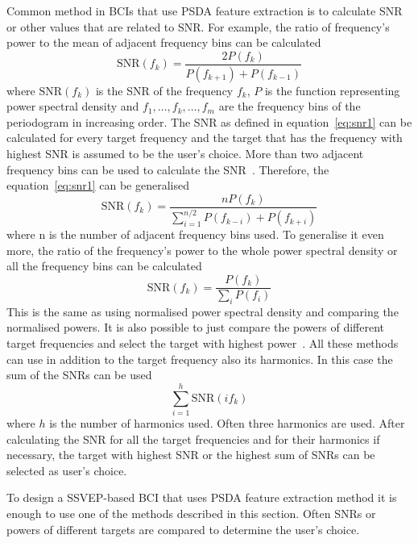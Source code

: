 Common method in \glspl{BCI} that use \gls{PSDA} \gls{feature extraction} is to calculate \gls{SNR} or other values that are related to \gls{SNR}. For example, the ratio of frequency's power to the mean of adjacent frequency bins can be calculated~\cite{psda_snr1}
\begin{equation}
	\label{eq:snr1}
	\mbox{SNR}(f_k) = \frac{2P(f_k)}{P(f_{k+1})+P(f_{k-1})}
\end{equation}
where $\mbox{SNR}(f_k)$ is the \gls{SNR} of the frequency $f_k$, $P$ is the function representing \gls{power spectral density} and $f_1,\dots, f_k,\dots,f_m$ are the \glspl{frequency bin} of the \gls{periodogram} in increasing order. The \gls{SNR} as defined in equation~\ref{eq:snr1} can be calculated for every \gls{target} frequency and the \gls{target} that has the frequency with highest \gls{SNR} is assumed to be the user's choice. More than two adjacent frequency bins can be used to calculate the \gls{SNR}~\cite{psda_snr2}. Therefore, the equation~\ref{eq:snr1} can be generalised
\begin{equation}
	\mbox{SNR}(f_k) = \frac{nP(f_k)}{\sum_{i=1}^{n/2}P(f_{k-i})+P(f_{k+i})}
\end{equation}
where n is the number of adjacent frequency bins used. To generalise it even more, the ratio of the frequency's power to the whole \gls{power spectral density} or all the \glspl{frequency bin} can be calculated
\begin{equation}
	\mbox{SNR}(f_k) = \frac{P(f_k)}{\sum_i P(f_i)}
\end{equation}
This is the same as using normalised \gls{power spectral density} and comparing the normalised powers. It is also possible to just compare the powers of different \gls{target} frequencies and select the \gls{target} with highest power~\cite{cca_psda}. All these methods can use in addition to the \gls{target} frequency also its \glspl{harmonic}. In this case the sum of the \glspl{SNR} can be used
\begin{equation}
	\sum_{i=1}^{h}\mbox{SNR}(if_k)
\end{equation}
where $h$ is the number of \glspl{harmonic} used. Often three \glspl{harmonic} are used. After calculating the \gls{SNR} for all the \gls{target} frequencies and for their \glspl{harmonic} if necessary, the \gls{target} with highest \gls{SNR} or the highest sum of \glspl{SNR} can be selected as user's choice.

To design a \gls{SSVEP}-based \gls{BCI} that uses \gls{PSDA} \gls{feature extraction} method it is enough to use one of the methods described in this section. Often \glspl{SNR} or powers of different \glspl{target} are compared to determine the user's choice.

